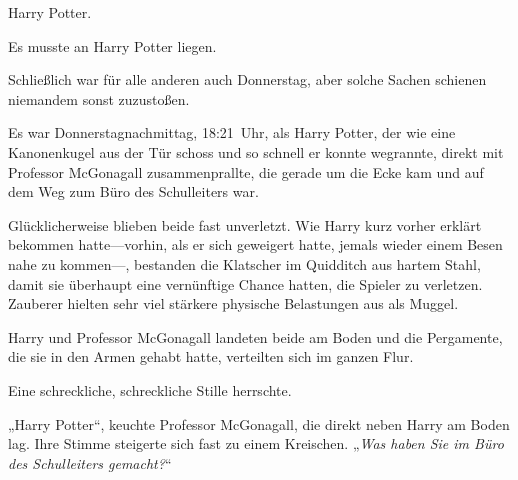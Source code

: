 \later

Harry Potter.

Es musste an Harry Potter liegen.

Schließlich war für alle anderen auch Donnerstag, aber solche Sachen schienen niemandem sonst zuzustoßen.

Es war Donnerstagnachmittag, 18:21~Uhr, als Harry Potter, der wie eine Kanonenkugel aus der Tür schoss und so schnell er konnte wegrannte, direkt mit Professor McGonagall zusammenprallte, die gerade um die Ecke kam und auf dem Weg zum Büro des Schulleiters war.

Glücklicherweise blieben beide fast unverletzt. Wie Harry kurz vorher erklärt bekommen hatte—vorhin, als er sich geweigert hatte, jemals wieder einem Besen nahe zu kommen—, bestanden die Klatscher im Quidditch aus hartem Stahl, damit sie überhaupt eine vernünftige Chance hatten, die Spieler zu verletzen. Zauberer hielten sehr viel stärkere physische Belastungen aus als Muggel.

Harry und Professor McGonagall landeten beide am Boden und die Pergamente, die sie in den Armen gehabt hatte, verteilten sich im ganzen Flur.

Eine schreckliche, schreckliche Stille herrschte.

„Harry Potter“, keuchte Professor McGonagall, die direkt neben Harry am Boden lag. Ihre Stimme steigerte sich fast zu einem Kreischen. „\emph{Was haben Sie im Büro des Schulleiters gemacht?}“


